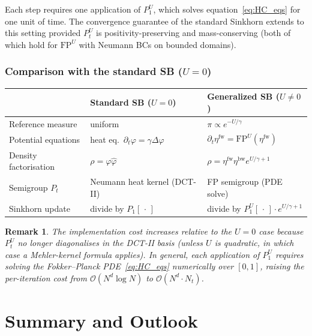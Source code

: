 \documentclass[11pt,a4paper]{article}
\newtheorem{remark}[theorem]{Remark}
\newcommand{\Pt}[1]{P_{#1}}   %
\newcommand{\fw}{{\mathrm{fw}}}   %
\newcommand{\bw}{{\mathrm{bw}}}   %
\newcommand{\FPU}{\mathrm{FP}^U}  %
\begin{document}
Each step requires one application of $\Pt{1}^U$, which solves
equation~\eqref{eq:HC_eqs} for one unit of time.
The convergence guarantee of the standard Sinkhorn extends to this setting
provided $\Pt{t}^U$ is positivity-preserving and mass-conserving (both of
which hold for $\FPU$ with Neumann BCs on bounded domains).

\subsubsection*{Comparison with the standard SB ($U=0$)}

\begin{center}
\renewcommand{\arraystretch}{1.4}
\begin{tabular}{lll}
\toprule
& \textbf{Standard SB} ($U=0$) & \textbf{Generalized SB} ($U\ne 0$) \\
\midrule
Reference measure & uniform & $\pi \propto e^{-U/\gamma}$ \\
Potential equations & heat eq.\ $\partial_t\varphi = \gamma\Delta\varphi$ &
                     $\partial_t\eta^\fw = \FPU(\eta^\fw)$ \\
Density factorisation & $\rho = \varphi\hat\varphi$ &
                        $\rho = \eta^\fw\eta^\bw e^{U/\gamma+1}$ \\
Semigroup $\Pt{t}$ & Neumann heat kernel (DCT-II) &
                    FP semigroup (PDE solve) \\
Sinkhorn update & divide by $\Pt{1}[\,\cdot\,]$ &
                  divide by $\Pt{1}^U[\,\cdot\,]\cdot e^{U/\gamma+1}$ \\
\bottomrule
\end{tabular}
\end{center}

\begin{remark}
The implementation cost increases relative to the $U=0$ case because
$\Pt{t}^U$ no longer diagonalises in the DCT-II basis (unless $U$ is
quadratic, in which case a Mehler-kernel formula applies).
In general, each application of $\Pt{1}^U$ requires solving the
Fokker--Planck PDE~\eqref{eq:HC_eqs} numerically over $[0,1]$, raising
the per-iteration cost from $\mathcal{O}(N^d\log N)$ to
$\mathcal{O}(N^d\cdot N_t)$.
\end{remark}

\section{Summary and Outlook}
\end{document}
